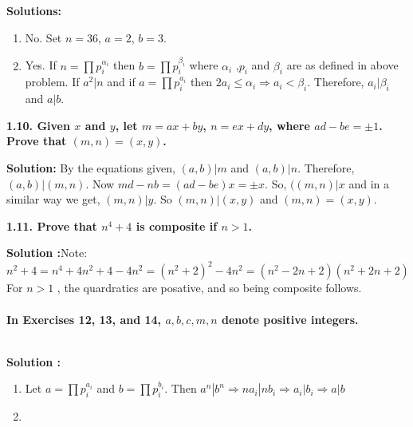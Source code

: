 \documentclass[oneside]{book}
\begin{document}
\textbf{Solutions:}
\begin{enumerate}
    \item No. Set $n=36$, $a=2$, $b=3$.
    \item Yes. If $n=\prod p_i^{\alpha_i}$ then $b=\prod p_i^{\beta_i}$ where $\alpha_i$ ,$p_i$ and $\beta_i$ are as defined in above problem. If $a^2|n$ and if $a=\prod p_i^{a_i}$ then $2a_i\leq \alpha_i\Rightarrow a_i<\beta_i$. Therefore, $a_i|\beta_i$ and $a|b$.
\end{enumerate}

\begin{tcolorbox}
\textbf{1.10. Given $x$ and $y$, let $m = ax+ by$, $n =ex + dy$, where $ad- be = \pm1$. Prove that 
$(m, n) = (x, y)$. }
\end{tcolorbox}
\textbf{Solution: }By the equations given, $(a,b)|m$ and $(a,b)|n$. Therefore, $(a,b)|(m,n)$. Now $md-nb=(ad-be)x=\pm x$.  So, $((m,n)|x$ and in a similar way we get, $(m,n)|y$. So $(m,n)|(x,y)$ and $(m,n)=(x,y)$.

\begin{tcolorbox}
\textbf{1.11. Prove that $n^4 + 4$ is composite if $n > 1$.}
\end{tcolorbox}
\textbf{Solution :}Note:
$$n^2+4=n^4+4n^2+4-4n^2= (n^2+2)^2-4n^2=(n^2-2n+2)(n^2+2n+2)$$
For $n>1$
, the quardratics are  posative, and so being composite follows.\\\\
\textbf{In Exercises 12, 13, and 14, $a, b, c, m, n$ denote positive integers.}\\\\
\textbf{Solution :}
\begin{enumerate}
    \item Let $a=\prod p_i^{a_i}$ and $b=\prod p_i^{b_i}$. Then $a^n|b^n\Rightarrow na_i|nb_i\Rightarrow a_i|b_i\Rightarrow a|b$
    \item 
\end{enumerate}






\chapter{}
\end{document}
